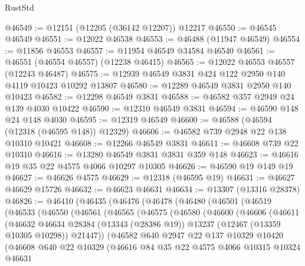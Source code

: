 \begin{lexlean}{RustStd}
\begin{coremodule}
@46549 := @12151 (@12205 (@36142 @12207)) @12217
@46550 := @46545 @46549
@46551 := @12022 @46538
@46553 := @46488 (@11947 @46549)
@46554 := @11856 @46553
@46557 := @11954 @46549 @34584 @46540
@46561 := @46551 (@46554 @46557) (@12238 @46415)
@46565 := @12022 @46553 @46557 (@12243 @46487)
@46575 := @12939 @46549 @3831 @424 @122 @2950 @140 @4119 @10423 @10292 @13807
@46580 := @12289 @46549 @3831 @2950 @140 @10423
@46582 := @12298 @46549 @3831
@46588 := @46582 @357 @2949 @24 @139 @4030 @10422
@46590 := @12310 @46549 @3831
@46594 := @46590 @148 @24 @148 @4030
@46595 := @12319 @46549
@46600 := @46588 (@46594 (@12318 (@46595 @148)) @12329)
@46606 := @46582 @739 @2948 @22 @138 @10310 @10421
@46608 := @12266 @46549 @3831
@46611 := @46608 @739 @22 @10310
@46616 := @13280 @46549 @3831 @3831 @359 @148
@46623 := @46616 @19 @35 @22 @4575 @4066 @10297 @10305
@46626 := @46590 @19 @149 @19
@46627 := @46626 @4575
@46629 := @12318 (@46595 @19)
@46631 := @46627 @46629 @15726
@46632 := @46623 @46631
@46634 := @13307 (@13316 @28378)
@46826 := @46410
    (@46435
      (@46476
        (@46478
          (@46480
            (@46501
              (@46519
                (@46533
                  (@46550
                    (@46561
                      (@46565
                        (@46575
                          (@46580
                            (@46600
                              (@46606
                                (@46611
                                  (@46632
                                    @46634
                                    @28384
                                    (@13343 (@28386 @19))
                                    @13237
                                    (@12467 (@13359 @10305 @10298))
                                    @21447))
                                (@46582
                                  @640
                                  @2947
                                  @22
                                  @137
                                  @10329
                                  @10420
                                  (@46608
                                    @640
                                    @22
                                    @10329
                                    (@46616
                                      @84
                                      @35
                                      @22
                                      @4575
                                      @4066
                                      @10315
                                      @10324
                                      @46631

\end{coremodule}
\end{lexlean}
